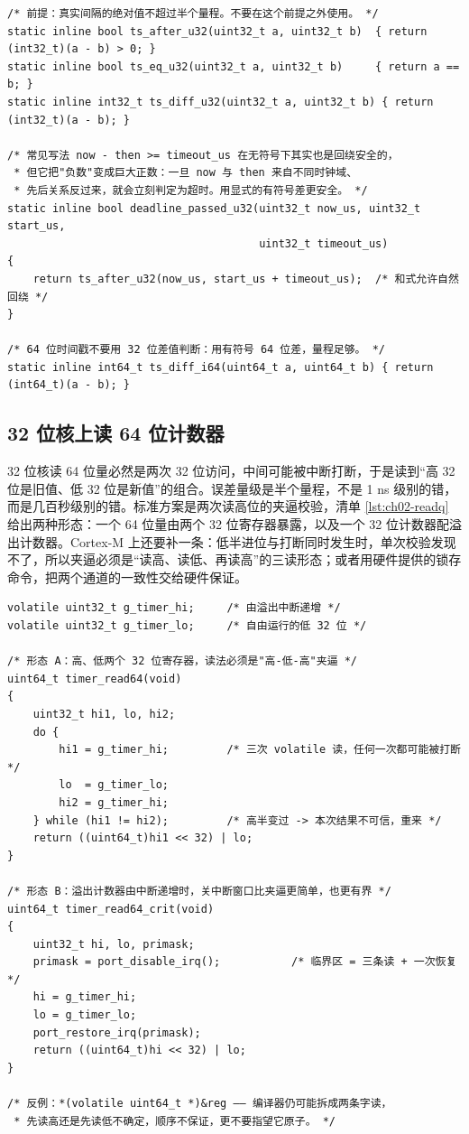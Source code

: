 \documentclass[12pt,a4paper,fontset=fandol]{ctexbook}
\begin{document}
\begin{lstlisting}[style=cstyle,caption={回绕安全的比较范式与超时判断},label={lst:ch02-wrapcode}]
/* 前提：真实间隔的绝对值不超过半个量程。不要在这个前提之外使用。 */
static inline bool ts_after_u32(uint32_t a, uint32_t b)  { return (int32_t)(a - b) > 0; }
static inline bool ts_eq_u32(uint32_t a, uint32_t b)     { return a == b; }
static inline int32_t ts_diff_u32(uint32_t a, uint32_t b) { return (int32_t)(a - b); }

/* 常见写法 now - then >= timeout_us 在无符号下其实也是回绕安全的，
 * 但它把"负数"变成巨大正数：一旦 now 与 then 来自不同时钟域、
 * 先后关系反过来，就会立刻判定为超时。用显式的有符号差更安全。 */
static inline bool deadline_passed_u32(uint32_t now_us, uint32_t start_us,
                                       uint32_t timeout_us)
{
    return ts_after_u32(now_us, start_us + timeout_us);  /* 和式允许自然回绕 */
}

/* 64 位时间戳不要用 32 位差值判断：用有符号 64 位差，量程足够。 */
static inline int64_t ts_diff_i64(uint64_t a, uint64_t b) { return (int64_t)(a - b); }
\end{lstlisting}

\subsection{32 位核上读 64 位计数器}

32 位核读 64 位量必然是两次 32 位访问，中间可能被中断打断，于是读到``高 32 位是旧值、低 32 位是新值''的组合。误差量级是半个量程，不是 1 ns 级别的错，而是几百秒级别的错。标准方案是两次读高位的夹逼校验，清单 \ref{lst:ch02-readq} 给出两种形态：一个 64 位量由两个 32 位寄存器暴露，以及一个 32 位计数器配溢出计数器。Cortex-M 上还要补一条：低半进位与打断同时发生时，单次校验发现不了，所以夹逼必须是``读高、读低、再读高''的三读形态；或者用硬件提供的锁存命令，把两个通道的一致性交给硬件保证。

\begin{lstlisting}[style=cstyle,caption={32 位核上的 64 位计数读取：夹逼校验与关中断两种形态},label={lst:ch02-readq}]
volatile uint32_t g_timer_hi;     /* 由溢出中断递增 */
volatile uint32_t g_timer_lo;     /* 自由运行的低 32 位 */

/* 形态 A：高、低两个 32 位寄存器，读法必须是"高-低-高"夹逼 */
uint64_t timer_read64(void)
{
    uint32_t hi1, lo, hi2;
    do {
        hi1 = g_timer_hi;         /* 三次 volatile 读，任何一次都可能被打断 */
        lo  = g_timer_lo;
        hi2 = g_timer_hi;
    } while (hi1 != hi2);         /* 高半变过 -> 本次结果不可信，重来 */
    return ((uint64_t)hi1 << 32) | lo;
}

/* 形态 B：溢出计数器由中断递增时，关中断窗口比夹逼更简单，也更有界 */
uint64_t timer_read64_crit(void)
{
    uint32_t hi, lo, primask;
    primask = port_disable_irq();           /* 临界区 = 三条读 + 一次恢复 */
    hi = g_timer_hi;
    lo = g_timer_lo;
    port_restore_irq(primask);
    return ((uint64_t)hi << 32) | lo;
}

/* 反例：*(volatile uint64_t *)&reg —— 编译器仍可能拆成两条字读，
 * 先读高还是先读低不确定，顺序不保证，更不要指望它原子。 */
\end{lstlisting}
\end{document}
